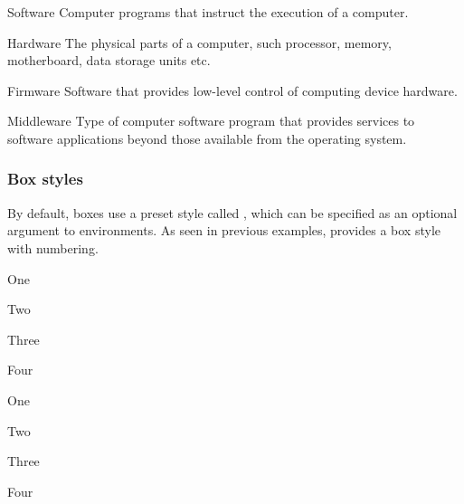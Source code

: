 \documentclass[a4paper, 11pt]{article}
\begin{document}
\begin{example}{}
    \begin{tcolorbox}[colback = black]
        \begin{PLTBoxRaster}
            \item[Software] Computer programs that instruct the execution of a computer.
            \item[Hardware]The physical parts of a computer, such processor, memory, motherboard, data storage units etc.
            \item[Firmware] Software that provides low-level control of computing device hardware.
            \item[Middleware] Type of computer software program that provides services to software applications beyond those available from the operating system.
        \end{PLTBoxRaster}
    \end{tcolorbox}
\end{example}

\subsubsection*{Box styles}

By default, boxes use a preset style called , which can be specified as an optional argument to  environments. As seen in previous examples,  provides a box style with numbering.

\begin{example}{}
    \begin{tcbraster}
        \begin{tcolorbox}
            \begin{PLTBoxRaster}[
                itemize,
                raster = {raster columns = 2}
            ]
                \item One
                \item Two
                \item Three
                \item Four
            \end{PLTBoxRaster}
        \end{tcolorbox}
        \begin{tcolorbox}
            \begin{PLTBoxRaster}[
                enumerate, Roman,
                raster = {raster columns = 2}
            ]
                \item One
                \item Two
                \item Three
                \item Four
            \end{PLTBoxRaster}
        \end{tcolorbox}
    \end{tcbraster}
\end{example}
\end{document}
